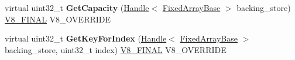 \begin{DoxyCompactItemize}
\item 
\hypertarget{classv8_1_1internal_1_1_elements_accessor_base_aec88f1b096ce4a49c4b9154ad52f4b2e}{}virtual uint32\+\_\+t {\bfseries Get\+Capacity} (\hyperlink{classv8_1_1internal_1_1_handle}{Handle}$<$ \hyperlink{classv8_1_1internal_1_1_fixed_array_base}{Fixed\+Array\+Base} $>$ backing\+\_\+store) \hyperlink{classv8_1_1internal_1_1_v8___f_i_n_a_l}{V8\+\_\+\+F\+I\+N\+A\+L} V8\+\_\+\+O\+V\+E\+R\+R\+I\+D\+E\label{classv8_1_1internal_1_1_elements_accessor_base_aec88f1b096ce4a49c4b9154ad52f4b2e}

\item 
\hypertarget{classv8_1_1internal_1_1_elements_accessor_base_a052ed7a6aff6c521dd8180d49d9da5af}{}virtual uint32\+\_\+t {\bfseries Get\+Key\+For\+Index} (\hyperlink{classv8_1_1internal_1_1_handle}{Handle}$<$ \hyperlink{classv8_1_1internal_1_1_fixed_array_base}{Fixed\+Array\+Base} $>$ backing\+\_\+store, uint32\+\_\+t index) \hyperlink{classv8_1_1internal_1_1_v8___f_i_n_a_l}{V8\+\_\+\+F\+I\+N\+A\+L} V8\+\_\+\+O\+V\+E\+R\+R\+I\+D\+E\label{classv8_1_1internal_1_1_elements_accessor_base_a052ed7a6aff6c521dd8180d49d9da5af}

\end{DoxyCompactItemize}
